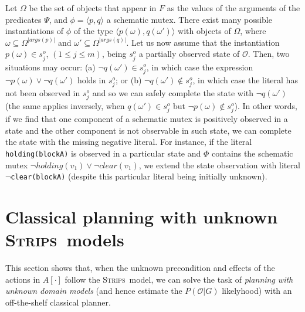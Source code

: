 \documentclass[letterpaper]{article} %
\newcommand{\tup}[1]{{\langle #1 \rangle}}
\newcommand{\strips}{\textsc{Strips}}     %
\begin{document}
Let $\Omega$ be the set of objects that appear in $F$ as the values of the arguments of the predicates $\Psi$, and $\phi=\tup{p,q}$ a schematic mutex. There exist many possible instantiations of $\phi$ of the type $\tup{p(\omega),q(\omega')}$ with objects of $\Omega$, where $\omega\subseteq\Omega^{|args(p)|}$ and $\omega'\subseteq\Omega^{|args(q)|}$. Let us now assume that the instantiation $p(\omega) \in s_j^o$, {\small $(1\leq j\leq m)$}, being $s_j^o$ a partially observed state of $\mathcal{O}$. Then, two situations may occur: (a) $\neg q(\omega') \in s_j^o$, in which case the expression $\neg p(\omega) \vee \neg q(\omega')$ holds in $s_j^o$; or (b) $\neg q(\omega') \notin s_j^o$, in which case the literal has not been observed in $s_j^o$ and so we can safely complete the state with $\neg q(\omega')$ (the same applies inversely, when $q(\omega') \in s_j^o$ but $\neg p(\omega) \notin s_j^o$). In other words, if we find that one component of a schematic mutex is positively observed in a state and the other component is not observable in such state, we can complete the state with the missing negative literal. For instance, if the literal {\tt\small holding(blockA)} is observed in a particular state and $\Phi$ contains the schematic mutex $\neg holding(v_1)\vee\neg clear(v_1)$, we extend the state observation with literal {\tt\small $\neg$clear(blockA)} (despite this particular literal being initially unknown).



\section{Classical planning with unknown \strips\ models}
\label{sec:planning}
This section shows that, when the unknown precondition and effects of the actions in $A[\cdot]$ follow the \strips\ model, we can solve the task of {\em planning with unknown domain models} (and hence estimate the $P(\mathcal{O}|G)$ likelyhood) with an off-the-shelf classical planner.
\end{document}

